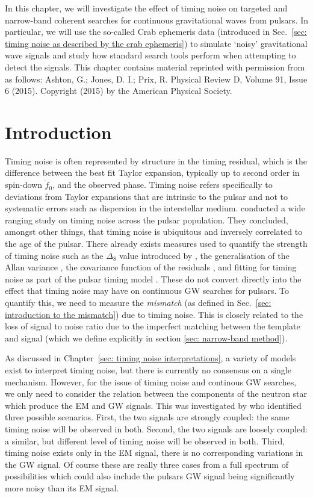 \documentclass[../full_thesis/full_thesis.tex]{subfiles}
\begin{document}
In this chapter, we will investigate the effect of timing noise on targeted and
narrow-band coherent searches for continuous gravitational waves from pulsars.
In particular, we will use the so-called Crab ephemeris data (introduced in
Sec.~\ref{sec: timing noise as described by the crab ephemeris}) to simulate
`noisy' gravitational wave signals and study how standard search tools perform
when attempting to detect the signals. This chapter contains material reprinted
with permission from \citet{Ashton2015} as follows: Ashton, G.; Jones, D. I.;
Prix, R. Physical Review D, Volume 91, Issue 6 (2015).  Copyright (2015) by the
American Physical Society.

\section{Introduction}
\label{sec: narrow-band introduction}

Timing noise is often represented by structure in the timing residual, which is
the difference between the best fit Taylor expansion, typically up to second
order in spin-down $\ddot{f}_0$, and the observed phase. Timing noise refers
specifically to deviations from Taylor expansions that are intrinsic to the
pulsar and not to systematic errors such as dispersion in the interstellar
medium.  \citet{Hobbs2010} conducted a wide ranging study on timing noise
across the pulsar population.  They concluded, amongst other things, that
timing noise is ubiquitous and inversely correlated to the age of the pulsar.
There already exists measures used to quantify the strength of timing noise
such as the $\Delta_{8}$ value introduced by \citet{Arzoumanian1994}, the
generalisation of the Allan variance \citep{Matsakis1997}, the covariance
function of the residuals \citep{Coles2011}, and fitting for timing noise as
part of the pulsar timing model \citep{Lentati2014}. These do not convert
directly into the effect that timing noise may have on continuous GW searches
for pulsars. To quantify this, we need to measure the \emph{mismatch} (as
defined in Sec.~\ref{sec: introduction to the mismatch}) due to
timing noise. 
This is closely related to the loss of signal to noise ratio due
to the imperfect matching between the template and signal (which we define
explicitly in section \ref{sec: narrow-band method}).

As discussed in Chapter~\ref{sec: timing noise interpretations},
a variety of models exist to interpret timing noise, but there is
currently no consensus on a single mechanism. However, for the issue of timing
noise and continous GW searches, we only need to consider the relation between the
components of the neutron star which produce the EM and GW signals.  This was
investigated by \citet{Jones2004} who identified three possible scenarios.
First, the two signals are strongly coupled: the same timing noise will be
observed in both. Second, the two signals are loosely coupled: a similar, but
different level of timing noise will be observed in both. Third, timing noise
exists only in the EM signal, there is no corresponding variations in the GW
signal. Of course these are really three cases from a full spectrum of
possibilities which could also include the pulsars GW signal being significantly more noisy than its EM signal.
\end{document}
